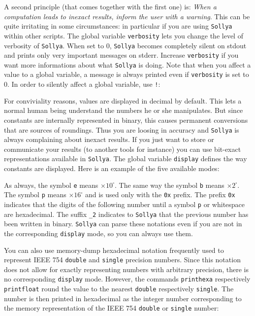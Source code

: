 \documentclass[a4paper]{article}
\newcommand{\com}[1]{\texttt{#1}}
\newcommand{\key}[1]{\texttt{#1}}
\newcommand{\sollya}{\texttt{Sollya}\xspace}
\begin{document}
A second principle (that comes together with the first one) is: \emph{When a computation leads to inexact results, inform the user with a warning}. This can be quite irritating in some circumstances: in particular if you are using \sollya within other scripts. The global variable \key{verbosity} lets you change the level of verbosity of \sollya. When set to $0$, \sollya becomes completely silent on stdout and prints only very important messages on stderr. Increase \key{verbosity} if you want more informations about what \sollya is doing. Note that when you affect a value to a global variable, a message is always printed even if \com{verbosity} is set to $0$. In order to silently affect a global variable, use \texttt{!}:



For conviviality reasons, values are displayed in decimal by default. This lets a normal human being understand the numbers he or she manipulates. But since constants are internally represented in binary, this causes permanent conversions that are sources of roundings. Thus you are loosing in accuracy and \sollya is always complaining about inexact results. If you just want to store or communicate your results (to another tools for instance) you can use bit-exact representations available in \sollya. The global variable \key{display} defines the way constants are displayed. Here is an example of the five available modes:



As always, the symbol \texttt{e} means $\times 10^\square $. The same way the symbol \texttt{b} means  $\times 2^\square $. The symbol \texttt{p} means $\times 16^\square$ and is used only with the \texttt{0x} prefix. The prefix \texttt{0x} indicates that the digits of the following number until 
a symbol \texttt{p} or whitespace are hexadecimal. The suffix \texttt{\_2} indicates to \sollya that the previous number has been written in binary. \sollya can parse these notations even if you are not in the corresponding \key{display} mode, so you can always use them.

You can also use memory-dump hexadecimal notation frequently used to represent IEEE 754 \texttt{double} and \texttt{single} precision numbers. Since this notation does not allow for exactly representing numbers with arbitrary precision, there is no corresponding \key{display} mode. However, the commands \com{printhexa} respectively \com{printfloat} round the value to the nearest \texttt{double} respectively \texttt{single}. The number is then printed in hexadecimal as the integer number corresponding to the memory representation of the IEEE 754 \texttt{double} or \texttt{single} number:
\end{document}
